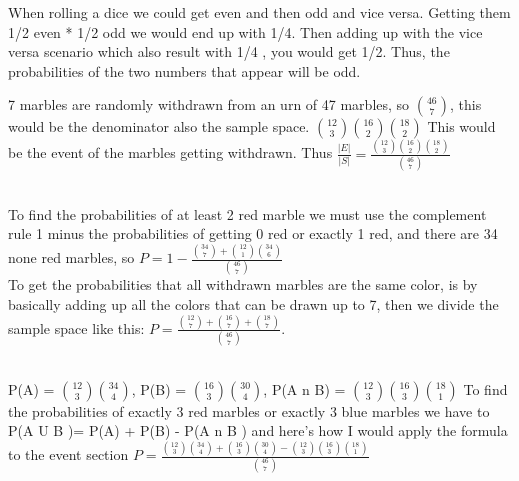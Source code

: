\documentclass[12pt]{article}
\begin{document}
\begin{enumerate}

When rolling a dice we could get even and then odd and vice versa. Getting them 1/2 even * 1/2 odd we would end up with 1/4. Then  adding up with the vice versa scenario which also result with 1/4 , you would get 1/2. Thus, the probabilities of the two numbers that appear will be odd. 


7 marbles are randomly withdrawn from an urn of 47 marbles, so $\binom{46}{7}$, this would be the denominator also the sample space. 
$\binom{12}{3}\binom{16}{2}\binom{18}{2}$ This would be the event of the marbles getting withdrawn. Thus $\frac{|E|}{|S|}= \frac{\binom{12}{3}\binom{16}{2}\binom{18}{2}}{\binom{46}{7}}$

\\To find the probabilities of at least 2 red marble we must use the complement rule 1 minus the probabilities of getting 0 red or exactly 1 red, and there are 34 none red marbles, so $P = 1 - \frac{\binom{34}{7} + \binom{12}{1}\binom{34}{6}}{\binom{46}{7}}$
 \\To get the probabilities that all withdrawn marbles are the same color, is by basically adding up all the colors that can be drawn up to 7, then we divide the sample space like this: $P = \frac{\binom{12}{7} + \binom{16}{7} + \binom{18}{7}}{\binom{46}{7}}$.


\\
P(A) = $\binom{12}{3}\binom{34}{4}$,
P(B) = $\binom{16}{3}\binom{30}{4}$, P(A n B) = $\binom{12}{3}\binom{16}{3}\binom{18}{1}$
To find the probabilities of exactly 3 red marbles or exactly 3 blue marbles we have to P(A U B )= P(A) + P(B) - P(A n B ) and here's how I would apply the formula to the event section $P = \frac{\binom{12}{3}\binom{34}{4} + \binom{16}{3}\binom{30}{4} - \binom{12}{3}\binom{16}{3}\binom{18}{1}}{\binom{46}{7}}$


\end{enumerate}
\end{document}
